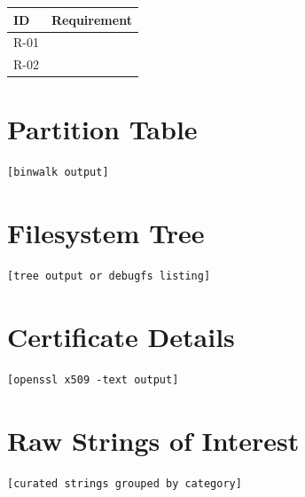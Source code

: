\documentclass[12pt,a4paper]{article}
\begin{document}
\begin{tabularx}{\linewidth}{lX}
  \toprule
  \rowcolor{tabhead}
  \textcolor{tabheadtext}{\textbf{ID}} &
  \textcolor{tabheadtext}{\textbf{Requirement}} \\
  \midrule
  R-01 & \\
  \rowcolor{rowalt}
  R-02 & \\
  \bottomrule
\end{tabularx}

\appendix

\section{Partition Table}\label{app:partition-table}

\begin{lstlisting}
[binwalk output]
\end{lstlisting}

\section{Filesystem Tree}\label{app:fs-tree}

\begin{lstlisting}
[tree output or debugfs listing]
\end{lstlisting}

\section{Certificate Details}\label{app:certs}

\begin{lstlisting}
[openssl x509 -text output]
\end{lstlisting}

\section{Raw Strings of Interest}\label{app:strings}

\begin{lstlisting}
[curated strings grouped by category]
\end{lstlisting}
\end{document}
